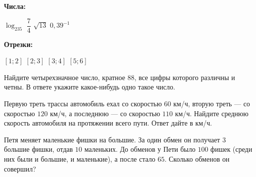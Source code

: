 \begin{class}[number=5]
\begin{listofex}
		\begin{minipage}[t]{0.58\linewidth}
			\textbf{Числа:}
			\begin{tasks}
				\task \( \log_235 \)
				\task \( \dfrac{ 7 }{4  } \)
				\task \( \sqrt{13} \)
				\task \( 0,39^{-1} \)
			\end{tasks}
		\end{minipage}
		\hspace{0.05\linewidth}
		\begin{minipage}[t]{\textwidth}
			\textbf{Отрезки:}
			\begin{tasks}
				\task \( [1;2] \)
				\task \( [2;3] \)
				\task \( [3;4] \)
				\task \( [5;6] \)
			\end{tasks}
		\end{minipage}
		\item Найдите четырехзначное число, кратное \(88\), все цифры которого различны и четны. В ответе укажите какое-нибудь одно такое число.
		\item Первую треть трассы автомобиль ехал со скоростью \(60\) км/ч, вторую треть --- со скоростью \(120\) км/ч, а последнюю --- со скоростью \(110\) км/ч. Найдите среднюю скорость автомобиля на протяжении всего пути. Ответ дайте в км/ч.
		\item Петя меняет маленькие фишки на большие. За один обмен он получает \(3\) большие фишки, отдав \(10\) маленьких. До обменов у Пети было \(100\) фишек (среди них были и большие, и маленькие), а после стало \(65\). Сколько обменов он совершил?
	\end{listofex}
\end{class}

